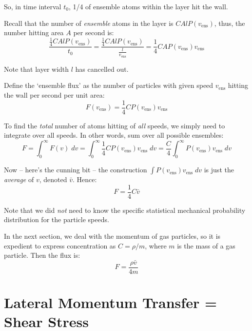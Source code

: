 \documentclass[12pt, a4paper, twoside, openright]{book}
\newcommand{\vens}{\ensuremath{v_{\mathrm{ens}}}}
\begin{document}
So, in time interval $t_{0}$, 1/4 of ensemble atoms within the layer hit the wall.

\vspace{1em}
Recall that the number of \emph{ensemble} atoms in the layer is $ C A l P(\vens) $,
thus, the number hitting area $A$ per second is:
\begin{equation}
\frac{\frac{1}{4} C A l P(\vens)  }{t_0} 
 = \frac{ \frac{1}{4} C A l P(\vens)}{ \frac{l}{\vens} } =
 \frac{1}{4} C A P(\vens) \vens
\end{equation}

Note that layer width $l$ has cancelled out.

\vspace{1em}
Define the `ensemble flux' as the number of particles with given speed $\vens$ hitting the wall per second per unit area:
\begin{equation}
F(\vens) = \frac{1}{4} C P(\vens) \vens
\end{equation}

\vspace{1em}
To find the \emph{total} number of atoms hitting of \emph{all} speeds, we simply need to integrate over all speeds.  In other words, sum over all possible ensembles:
\begin{equation}
F = \int_{0}^{\infty} F(v) \; dv = \int_{0}^{\infty} \frac{1}{4} C P(\vens) \vens \; dv = \frac{C}{4} \int_{0}^{\infty} P(\vens) \vens \; dv
\end{equation}

Now -- here's the cunning bit -- the construction $ \int P(\vens) \vens \; dv$ is just the \emph{average} of $v$, denoted $\bar{v}$. Hence:
\begin{equation}
F = \frac{1}{4} C \bar{v}
\end{equation}


Note that we did \emph{not} need to know the specific statistical mechanical probability distribution for the particle speeds.

\vspace*{1em}
In the next section, we deal with the momentum of gas particles, so it is expedient to express concentration as $C = \rho/m$, where $m$ is the mass of a gas particle.  Then the flux is:
\begin{equation}
F = \frac{\rho \bar{v}}{4 m}
\end{equation}

\section{Lateral Momentum Transfer = Shear Stress}
\end{document}
